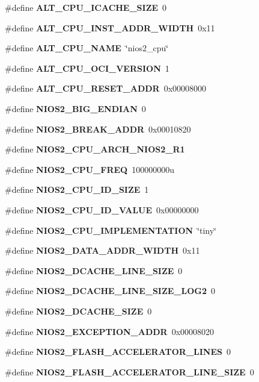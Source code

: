 \begin{DoxyCompactItemize}
\item 
\#define {\bf A\+L\+T\+\_\+\+C\+P\+U\+\_\+\+I\+C\+A\+C\+H\+E\+\_\+\+S\+I\+ZE}~0
\item 
\#define {\bf A\+L\+T\+\_\+\+C\+P\+U\+\_\+\+I\+N\+S\+T\+\_\+\+A\+D\+D\+R\+\_\+\+W\+I\+D\+TH}~0x11
\item 
\#define {\bf A\+L\+T\+\_\+\+C\+P\+U\+\_\+\+N\+A\+ME}~\char`\"{}nios2\+\_\+cpu\char`\"{}
\item 
\#define {\bf A\+L\+T\+\_\+\+C\+P\+U\+\_\+\+O\+C\+I\+\_\+\+V\+E\+R\+S\+I\+ON}~1
\item 
\#define {\bf A\+L\+T\+\_\+\+C\+P\+U\+\_\+\+R\+E\+S\+E\+T\+\_\+\+A\+D\+DR}~0x00008000
\item 
\#define {\bf N\+I\+O\+S2\+\_\+\+B\+I\+G\+\_\+\+E\+N\+D\+I\+AN}~0
\item 
\#define {\bf N\+I\+O\+S2\+\_\+\+B\+R\+E\+A\+K\+\_\+\+A\+D\+DR}~0x00010820
\item 
\#define {\bf N\+I\+O\+S2\+\_\+\+C\+P\+U\+\_\+\+A\+R\+C\+H\+\_\+\+N\+I\+O\+S2\+\_\+\+R1}
\item 
\#define {\bf N\+I\+O\+S2\+\_\+\+C\+P\+U\+\_\+\+F\+R\+EQ}~100000000u
\item 
\#define {\bf N\+I\+O\+S2\+\_\+\+C\+P\+U\+\_\+\+I\+D\+\_\+\+S\+I\+ZE}~1
\item 
\#define {\bf N\+I\+O\+S2\+\_\+\+C\+P\+U\+\_\+\+I\+D\+\_\+\+V\+A\+L\+UE}~0x00000000
\item 
\#define {\bf N\+I\+O\+S2\+\_\+\+C\+P\+U\+\_\+\+I\+M\+P\+L\+E\+M\+E\+N\+T\+A\+T\+I\+ON}~\char`\"{}tiny\char`\"{}
\item 
\#define {\bf N\+I\+O\+S2\+\_\+\+D\+A\+T\+A\+\_\+\+A\+D\+D\+R\+\_\+\+W\+I\+D\+TH}~0x11
\item 
\#define {\bf N\+I\+O\+S2\+\_\+\+D\+C\+A\+C\+H\+E\+\_\+\+L\+I\+N\+E\+\_\+\+S\+I\+ZE}~0
\item 
\#define {\bf N\+I\+O\+S2\+\_\+\+D\+C\+A\+C\+H\+E\+\_\+\+L\+I\+N\+E\+\_\+\+S\+I\+Z\+E\+\_\+\+L\+O\+G2}~0
\item 
\#define {\bf N\+I\+O\+S2\+\_\+\+D\+C\+A\+C\+H\+E\+\_\+\+S\+I\+ZE}~0
\item 
\#define {\bf N\+I\+O\+S2\+\_\+\+E\+X\+C\+E\+P\+T\+I\+O\+N\+\_\+\+A\+D\+DR}~0x00008020
\item 
\#define {\bf N\+I\+O\+S2\+\_\+\+F\+L\+A\+S\+H\+\_\+\+A\+C\+C\+E\+L\+E\+R\+A\+T\+O\+R\+\_\+\+L\+I\+N\+ES}~0
\item 
\#define {\bf N\+I\+O\+S2\+\_\+\+F\+L\+A\+S\+H\+\_\+\+A\+C\+C\+E\+L\+E\+R\+A\+T\+O\+R\+\_\+\+L\+I\+N\+E\+\_\+\+S\+I\+ZE}~0
\item 

\end{DoxyCompactItemize}

